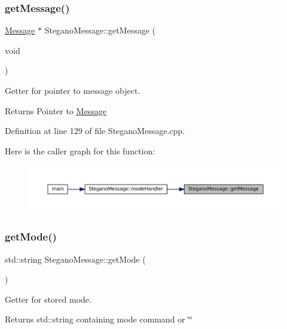 \subsubsection{\texorpdfstring{getMessage()}{getMessage()}}
{\footnotesize\ttfamily \mbox{\hyperlink{classMessage}{Message}} $\ast$ Stegano\+Message\+::get\+Message (\begin{DoxyParamCaption}\item[{void}]{ }\end{DoxyParamCaption})}



Getter for pointer to message object. 

\begin{DoxyReturn}{Returns}
Pointer to \mbox{\hyperlink{classMessage}{Message}} 
\end{DoxyReturn}


Definition at line 129 of file Stegano\+Message.\+cpp.

Here is the caller graph for this function\+:
\nopagebreak
\begin{figure}[H]
\begin{center}
\leavevmode
\includegraphics[width=350pt]{classSteganoMessage_ad29978e925056ad70dc5c45b1e1681eb_icgraph}
\end{center}
\end{figure}
\mbox{\label{classSteganoMessage_a7dc660e6d2c8f162636f789cfedde67e}} 
\subsubsection{\texorpdfstring{getMode()}{getMode()}}
{\footnotesize\ttfamily std\+::string Stegano\+Message\+::get\+Mode (\begin{DoxyParamCaption}{ }\end{DoxyParamCaption})}



Getter for stored mode. 

\begin{DoxyReturn}{Returns}
std\+::string containing mode command or \char`\"{}\char`\"{} 
\end{DoxyReturn}


